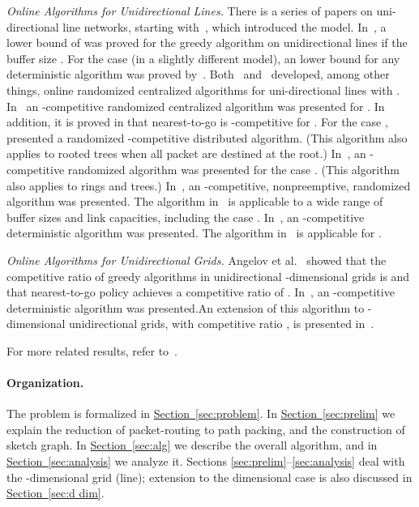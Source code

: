 \documentclass[11pt]{article}
\newcommand{\namedref}[2]{\hyperref[#2]{#1~\ref*{#2}}}
\newcommand{\sectionref}[1]{\namedref{Section}{#1}}
\newenvironment{proof sketch}[1]{\noindent {\emph{Proof sketch of #1:}}}{\hfill \qed}
\begin{document}
\emph{Online Algorithms for Unidirectional Lines.}
There is a series of papers on uni-directional line
networks, starting with~\cite{AKOR}, which introduced the
model. In~\cite{AKOR}, a lower bound of 
was proved for the greedy algorithm on unidirectional lines
if the buffer size .  For the case  (in a
slightly different model), an  lower bound for
any deterministic algorithm was proved by~\cite{AZ,AKK}.
Both~\cite{AZ} and~\cite{AKK} developed, among other
things, online randomized centralized algorithms for
uni-directional lines with . In~\cite{AKK} an
-competitive randomized centralized algorithm
was presented for .  In addition,  it is proved in \cite{AKK}
that nearest-to-go is
-competitive for .  For the case ,
~\cite{AKK} presented a randomized
-competitive distributed algorithm.
(This algorithm also applies to rooted trees when all
packet are destined at the root.) In~\cite{AZ}, an
-competitive randomized algorithm was
presented for the case .  (This algorithm also
applies to rings and trees.)
In~\cite{DBLP:conf/icalp/EvenM10}, an -competitive,
nonpreemptive, randomized algorithm was presented. The algorithm
in~\cite{DBLP:conf/icalp/EvenM10} is applicable to a wide range of
buffer sizes and link capacities, including the case .  In~\cite{DBLP:conf/spaa/EvenM11}, an -competitive deterministic algorithm was
presented. The algorithm in~\cite{DBLP:conf/spaa/EvenM11} is
applicable for .

\sloppy
\emph{Online Algorithms for Unidirectional Grids.} Angelov et al.~\cite{AKK} showed that the
competitive ratio of greedy algorithms in unidirectional
-dimensional grids is  and that
nearest-to-go policy achieves a competitive ratio of
.
In~\cite{DBLP:conf/spaa/EvenM11}, an -competitive deterministic algorithm was
presented.An extension of
this algorithm to -dimensional unidirectional grids, with competitive
ratio ,  is
presented in~\cite{DBLP:conf/spaa/EvenM11}.

For more related results, refer to~\cite{EM14}.


\paragraph{Organization\ifnum{}.\fi}
The problem is formalized in \sectionref{sec:problem}.
In \sectionref{sec:prelim} we explain the reduction of
packet-routing to path packing, and the construction of sketch graph.
In \sectionref{sec:alg} we describe the overall algorithm,
and in \sectionref{sec:analysis} we analyze it. Sections
\ref{sec:prelim}--\ref{sec:analysis} deal with the
-dimensional grid (line); extension to the 
dimensional case is also discussed in
\sectionref{sec:d dim}.
\end{document}
